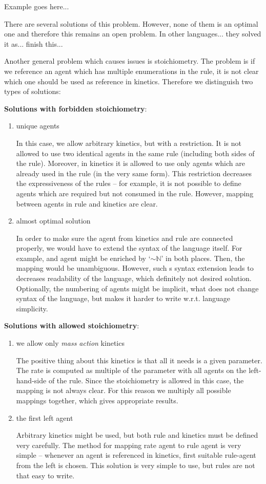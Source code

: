 \documentclass[12pt]{fithesis2}
\begin{document}
Example goes here...

There are several solutions of this problem. However, none of them is an optimal one and therefore this remains an open problem. In other languages... they solved it as... finish this...

Another general problem which causes issues is stoichiometry. The problem is if we reference an agent which has multiple enumerations in the rule, it is not clear which one should be used as reference in kinetics. Therefore we distinguish two types of solutions:

\textbf{Solutions with forbidden stoichiometry}:

\begin{enumerate}
\item unique agents

In this case, we allow arbitrary kinetics, but with a restriction. It is not allowed to use two identical agents in the same rule (including both sides of the rule). Moreover, in kinetics it is allowed to use only agents which are already used in the rule (in the very same form). This restriction decreases the expressiveness of the rules -- for example, it is not possible to define agents which are required but not consumed in the rule. However, mapping between agents in rule and kinetics are clear.

\item almost optimal solution

In order to make sure the agent from kinetics and rule are connected properly, we would have to extend the syntax of the language itself. For example, and agent might be enriched by `$\sim\mathbb{N}$' in both places. Then, the mapping would be unambiguous. However, such s syntax extension leads to decreases readability of the language, which definitely not desired solution. Optionally, the numbering of agents might be implicit, what does not change syntax of the language, but makes it harder to write w.r.t. language simplicity.

\end{enumerate}


\textbf{Solutions with allowed stoichiometry}:

\begin{enumerate}
\item we allow only \emph{mass action} kinetics

The positive thing about this kinetics is that all it needs is a given parameter. The rate is computed as multiple of the parameter with all agents on the left-hand-side of the rule. Since the stoichiometry is allowed in this case, the mapping is not always clear. For this reason we multiply all possible mappings together, which gives appropriate results.

\item the first left agent

Arbitrary kinetics might be used, but both rule and kinetics must be defined very carefully. The method for mapping rate agent to rule agent is very simple -- whenever an agent is referenced in kinetics, first suitable rule-agent from the left is chosen. This solution is very simple to use, but rules are not that easy to write.

\end{enumerate}
\end{document}
